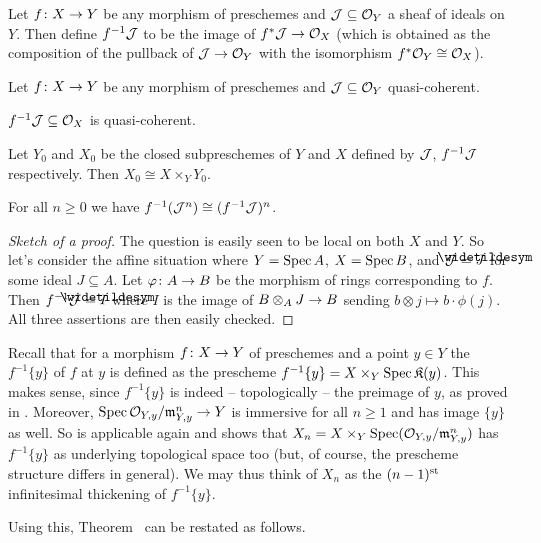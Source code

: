\documentclass[a4paper,parskip=half,numbers=enddot, DIV=12]{scrreprt}
\renewcommand{\geq}{\geqslant}
\begin{document}
\begin{defi}
	Let $f\colon X\morphism Y$ be any morphism of preschemes and $\mathcal{J}\subseteq \mathcal{O}_Y$ a sheaf of ideals on $Y$. Then define $f^{-1}\mathcal{J}$ to be the image of $f^*\Jj\morphism\Oo_X$ (which is obtained as the composition of the pullback of $\Jj\morphism \Oo_Y$ with the isomorphism $f^*\mathcal{O}_Y\cong \mathcal{O}_X$).
\end{defi}
\begin{lem}
	Let $f\colon X\morphism Y$ be any morphism of preschemes and $\mathcal{J}\subseteq \mathcal{O}_Y$ quasi-coherent.
	\begin{alphanumerate}
		\item $f^{-1}\mathcal{J}\subseteq \mathcal{O}_X$ is quasi-coherent.
		\item Let $Y_0$ and $X_0$ be the closed subpreschemes of $Y$ and $X$ defined by $\mathcal{J}$, $f^{-1}\mathcal{J}$ respectively. Then $X_0\cong X\times_YY_0$.
		\item For all $n\geq 0$ we have $f^{-1}(\mathcal{J}^n)\cong (f^{-1}\mathcal{J})^n$.
	\end{alphanumerate}
\end{lem}
\begin{proof}[Sketch of a proof]
	The question is easily seen to be local on both $X$ and $Y$. So let's consider the affine situation where $Y=\operatorname{Spec} A$, $X=\operatorname{Spec} B$, and $\Jj=\snake{J}$ for some ideal $J\subseteq A$. Let $\phi\colon A\morphism B$ be the morphism of rings corresponding to $f$. Then $f^{-1}\Jj=\snake{I}$ where $I$ is the image of $B\otimes_AJ\morphism B$ sending $b\otimes j\mapsto b\cdot \phi(j)$. All three assertions are then easily checked.
\end{proof}
\begin{rem}
	Recall that for a morphism $f\colon X\morphism Y$ of preschemes and a point $y\in Y$ the  $f^{-1}\{y\}$ of $f$ at $y$ is defined as the prescheme $f^{-1}\{y\}=X\times_Y\operatorname{Spec} \mathfrak{K}(y)$. This makes sense, since $f^{-1}\{y\}$ is indeed -- topologically -- the preimage of $y$, as proved in \cite[Corollary~1.3.3]{alggeo1}. Moreover, $\Spec \Oo_{Y,y}/\mm_{Y,y}^n\morphism Y$ is immersive for all $n\geq 1$ and has image $\{y\}$ as well. So \cite[Corollary~1.3.3]{alggeo1} is applicable again and shows that $X_n=X\times_Y\operatorname{Spec} (\mathcal{O}_{Y,y}/\mathfrak{m}_{Y,y}^n)$ has $f^{-1}\{y\}$ as underlying topological space too (but, of course, the prescheme structure differs in general). We may thus think of $X_n$ as the $(n-1)^{\text{st}}$ infinitesimal thickening of $f^{-1}\{y\}$. 
\end{rem}
Using this, Theorem~ can be restated as follows.
\end{document}
